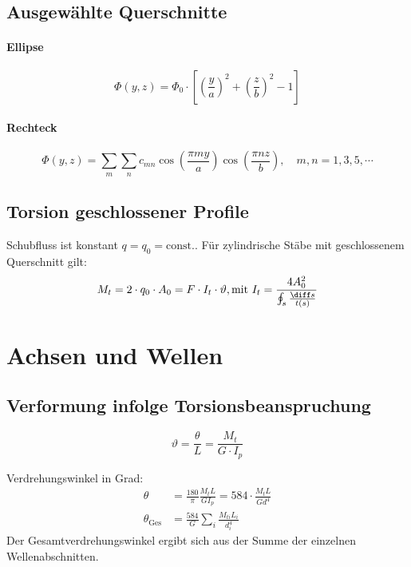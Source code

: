 	\subsection{Ausgewählte Querschnitte} %
		\paragraph{Ellipse} %
			\begin{equation*}
				\Phi(y,z) = \Phi_0 \cdot \left[ \left( \frac{y}{a}\right)^2 + \left( \frac{z}{b}\right)^2 -1\right]
			\end{equation*}
		\paragraph{Rechteck} %
			\begin{equation*}
				\Phi(y,z) = \sum_m \sum_n c_{mn} \cos \left( \frac{\pi m y}{a}\right) \cos \left( \frac{\pi n z}{b}\right), \quad m,n = 1, 3, 5, \cdots
			\end{equation*}
	\subsection{Torsion geschlossener Profile} %
		Schubfluss ist konstant $q = q_0 = \text{const.}$. Für zylindrische Stäbe mit geschlossenem Querschnitt gilt:
		\begin{equation*}
			M_t = 2 \cdot q_0 \cdot A_0 = F \cdot I_t \cdot \vartheta, \text{mit } I_t = \frac{4 A_0^2}{\oint_s \frac{\diff s}{t(s)}}
		\end{equation*}
\section{Achsen und Wellen} %
	\subsection{Verformung infolge Torsionsbeanspruchung} %
		\begin{equation*}
			\vartheta = \frac{\theta}{L} = \frac{M_t}{G \cdot I_p}
		\end{equation*}

		Verdrehungswinkel in Grad:
		\begin{align*}
			\theta &= \frac{180}{\pi} \frac{M_t L}{G I_p} = 584 \cdot \frac{M_t L}{G d^4} \\
			\theta_\text{Ges} &= \frac{584}{G} \sum_i \frac{M_{ti} L_i}{d_i^4}
		\end{align*}
		Der Gesamtverdrehungswinkel ergibt sich aus der Summe der einzelnen Wellenabschnitten.
